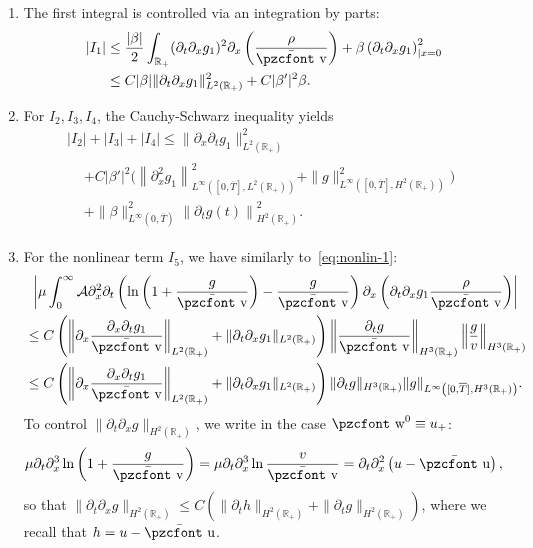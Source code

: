 \documentclass[10pt]{amsart}
\theoremstyle{definition}\newtheorem{defi}[theo]{Definition}\newtheorem{rema}[theo]{Remark}\newtheorem{exam}[theo]{Example}\newtheorem{exem}[theo]{Example}\newtheorem{nota}[theo]{Notation}
\newcommand{\mathpzc}[1]{\text{\pzcfont #1}}
\newcommand{\R}{\mathbb{R}}
\newcommand{\p}{\partial}
\newcommand{\bv}{\bar{\mathpzc{v}}}
\newcommand{\bu}{\bar{\mathpzc{u}}}
\newcommand{\cA}{\mathcal A}
\newcommand{\tw}{\mathpzc{w}}
\begin{document}
\begin{enumerate}
\item The first integral is controlled via an integration by parts:
\begin{align*}
|I_1| & \leq \dfrac{|\beta|}{2} \int_{\R_+} (\partial_t \partial_x g_1)^2 \partial_x \left(\frac{\rho}{\bv}\right) + \beta \left(\partial_t \partial_x g_1\right)^2_{|x=0} \\
& \leq C|\beta| \|\partial_t \partial_x g_1\|_{L^2(\R_+)}^2 + C |\beta'|^2 \beta.
\end{align*}
\item For $I_2, I_3, I_4$, the Cauchy-Schwarz inequality yields
\begin{multline*}
|I_2| + |I_3| + |I_4| \leq \|\partial_x \partial_t g_1\|_{L^2(\R_+)}^2 \\
\begin{aligned}
& + C|\beta'|^2 \Big(\left\|\partial^2_x g_1\right\|_{L^\infty\left([0,\overline{T}],L^2(\R_+)\right)}^2 + \|g\|_{L^\infty\left([0,\overline{T}],H^2(\R_+)\right)}^2 \Big) \\
& + \|\beta\|_{L^\infty\left(0,\overline{T}\right)}^2 \left\|\partial_t g(t)\right\|_{H^2(\R_+)}^2.
\end{aligned}
\end{multline*}

\item For the nonlinear term $I_5$, we have similarly to~\eqref{eq:nonlin-1}:
\begin{multline*}
\left| \mu \int_0^\infty \cA \partial^2_x \partial_t \left(\ln \left(1 + \frac{g}{\bv}\right) - \frac{g}{\bv}\right)\p_x\left(\partial_t \partial_x g_1 \dfrac{\rho}{\bv}\right)\right|\\
\begin{aligned}
& \leq C \left(\left\| \p_x \frac{\p_x \p_t g_1}{\bv} \right\|_{L^2(\R_+)} + \|\p_t \p_x g_1\|_{L^2(\R_+)}\right) {
\left\| \frac{\p_t g}{\bv}\right\|_{H^3(\R_+)} \left\| \frac{g}{v}\right\|_{H^3(\R_+)}}\\
&\leq C \left(\left\| \p_x \frac{\p_x \p_t g_1}{\bv} \right\|_{L^2(\R_+)} + \|\p_t \p_x g_1\|_{L^2(\R_+)}\right) \|\p_t g\|_{H^3(\R_+)} \| g\|_{L^\infty\left([0, \overline{T}], H^3(\R_+)\right)}.
\end{aligned}
\end{multline*}
To control $\|\partial_t \p_x g\|_{H^2(\R_+)}$, we write in the case $\tw^0\equiv u_+$:
\[
\mu \p_t \p_x^3 \ln\left(1 + \frac{g}{\bv}\right)=\mu \partial_t \partial^3_x \ln \frac{v}{\bv} = \partial_t \partial^2_x \left(u -\bu\right),
\]
so that $\|\partial_t \partial_x g\|_{H^2(\R_+)} \leq C(\|\partial_t h\|_{H^2(\R_+)} + \|\p_t g\|_{H^2(\R_+)})$, where we recall that $h = u -\bu$.
\end{enumerate}
\end{document}
